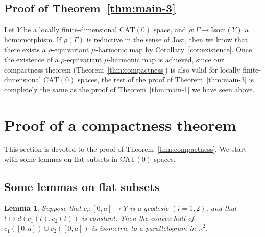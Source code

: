 \documentclass[12pt]{amsart}
\numberwithin{equation}{section}
\theoremstyle{plain}
\newtheorem{Lemma}[Theorem]{Lemma}
\theoremstyle{definition}
\theoremstyle{remark}
\newcommand{\R}{{\mathbb R}}
\newcommand{\isom}[1]{\mathrm{Isom}({#1})}
\newcommand{\cat}[1]{\mathrm{CAT}(#1)}
\begin{document}
\subsection{Proof of Theorem~\ref{thm:main-3}}
\label{sec:proof_of_thm_main-3}
 Let $Y$ be a locally finite-dimensional $\cat{0}$ space, and
 $\rho\colon \Gamma \rightarrow \isom{Y}$ a homomorphism. 
 If $\rho(\Gamma)$ is 
 reductive in the sense of Jost, 
 then we know that there exists a $\rho$-equivariant $\mu$-harmonic map
 by Corollary~\ref{cor:existence}. 
 Once the existence of a $\rho$-equivariant $\mu$-harmonic map is
 achieved, 
 since our compactness theorem (Theorem~\ref{thm:compactness})
 is also valid for locally finite-dimensional $\cat{0}$ spaces,
 the rest of the proof of Theorem~\ref{thm:main-3} is 
 completely the same as the proof of Theorem~\ref{thm:main-1} we have
 seen above. 



\section{Proof of a compactness theorem} 
\label{sec:key-lemma-proof}

This section is devoted to the proof of Theorem~\ref{thm:compactness}. 
We start with some lemmas on flat subsets in $\cat{0}$ spaces. 


\subsection{Some lemmas on flat subsets}
\label{sec:some-lemmas-flat}

%
%
\begin{Lemma}
\label{lem:parallelogram}
 Suppose that $c_i\colon [0,a]\rightarrow Y$ is a geodesic $(i=1,2)$,
 and that $t\mapsto d(c_1(t),c_2(t))$ is constant.  Then the convex hull
 of $c_1([0,a])\cup c_2([0,a])$ is isometric to a parallelogram in
 $\R^2$. 
\end{Lemma}
\end{document}
